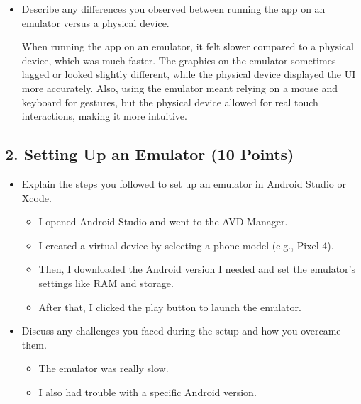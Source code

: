 \documentclass{article}
\begin{document}
\begin{itemize}
    \item Describe any differences you observed between running the app on an emulator versus a physical device.

    When running the app on an emulator, it felt slower compared to a physical device, which was much faster. The graphics on the emulator sometimes lagged or looked slightly different, while the physical device displayed the UI more accurately. Also, using the emulator meant relying on a mouse and keyboard for gestures, but the physical device allowed for real touch interactions, making it more intuitive.
    
\end{itemize}

\subsection*{2. Setting Up an Emulator (10 Points)}
\begin{itemize}
    \item Explain the steps you followed to set up an emulator in Android Studio or Xcode.

    \begin{itemize}
    
    \item I opened Android Studio and went to the AVD Manager.
    \item I created a virtual device by selecting a phone model (e.g., Pixel 4).
    \item Then, I downloaded the Android version I needed and set the emulator's settings like RAM and storage.
    \item After that, I clicked the play button to launch the emulator.
    
    \end{itemize}

    \item Discuss any challenges you faced during the setup and how you overcame them.

    \begin{itemize}
    
    \item The emulator was really slow.
    \item I also had trouble with a specific Android version.

    \end{itemize}


\end{itemize}
\end{document}
